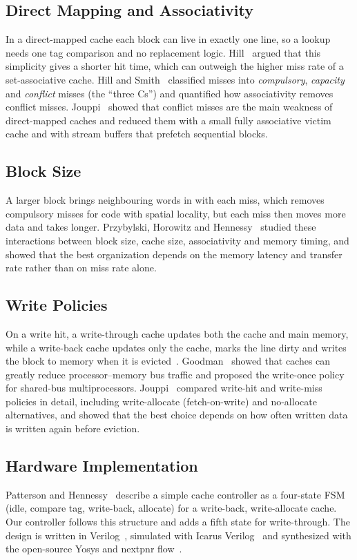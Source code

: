 \documentclass[conference]{IEEEtran}
\begin{document}
\subsection{Direct Mapping and Associativity}
In a direct-mapped cache each block can live in exactly one line, so a lookup needs one tag comparison and no replacement logic. Hill~\cite{hill1988} argued that this simplicity gives a shorter hit time, which can outweigh the higher miss rate of a set-associative cache. Hill and Smith~\cite{hillsmith1989} classified misses into \emph{compulsory}, \emph{capacity} and \emph{conflict} misses (the ``three Cs'') and quantified how associativity removes conflict misses. Jouppi~\cite{jouppi1990} showed that conflict misses are the main weakness of direct-mapped caches and reduced them with a small fully associative victim cache and with stream buffers that prefetch sequential blocks.

\subsection{Block Size}
A larger block brings neighbouring words in with each miss, which removes compulsory misses for code with spatial locality, but each miss then moves more data and takes longer. Przybylski, Horowitz and Hennessy~\cite{przybylski1988} studied these interactions between block size, cache size, associativity and memory timing, and showed that the best organization depends on the memory latency and transfer rate rather than on miss rate alone.

\subsection{Write Policies}
On a write hit, a write-through cache updates both the cache and main memory, while a write-back cache updates only the cache, marks the line dirty and writes the block to memory when it is evicted~\cite{smith1982}. Goodman~\cite{goodman1983} showed that caches can greatly reduce processor--memory bus traffic and proposed the write-once policy for shared-bus multiprocessors. Jouppi~\cite{jouppi1993} compared write-hit and write-miss policies in detail, including write-allocate (fetch-on-write) and no-allocate alternatives, and showed that the best choice depends on how often written data is written again before eviction.

\subsection{Hardware Implementation}
Patterson and Hennessy~\cite{patterson2017} describe a simple cache controller as a four-state FSM (idle, compare tag, write-back, allocate) for a write-back, write-allocate cache. Our controller follows this structure and adds a fifth state for write-through. The design is written in Verilog~\cite{ieee1364}, simulated with Icarus Verilog~\cite{icarus} and synthesized with the open-source Yosys and nextpnr flow~\cite{shah2019}.
\end{document}
